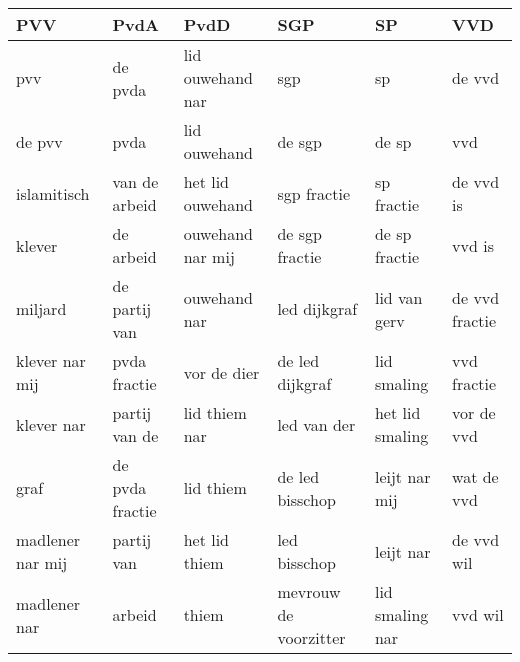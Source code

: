 \begin{tabular}{llllll}
\toprule
              PVV &             PvdA &              PvdD &                    SGP &               SP &             VVD \\
\midrule
              pvv &          de pvda &  lid ouwehand nar &                    sgp &               sp &          de vvd \\
           de pvv &             pvda &      lid ouwehand &                 de sgp &            de sp &             vvd \\
      islamitisch &    van de arbeid &  het lid ouwehand &            sgp fractie &       sp fractie &       de vvd is \\
           klever &        de arbeid &  ouwehand nar mij &         de sgp fractie &    de sp fractie &          vvd is \\
          miljard &    de partij van &      ouwehand nar &           led dijkgraf &     lid van gerv &  de vvd fractie \\
   klever nar mij &     pvda fractie &       vor de dier &        de led dijkgraf &      lid smaling &     vvd fractie \\
       klever nar &    partij van de &     lid thiem nar &            led van der &  het lid smaling &      vor de vvd \\
             graf &  de pvda fractie &         lid thiem &        de led bisschop &    leijt nar mij &      wat de vvd \\
 madlener nar mij &       partij van &     het lid thiem &           led bisschop &        leijt nar &      de vvd wil \\
     madlener nar &           arbeid &             thiem &  mevrouw de voorzitter &  lid smaling nar &         vvd wil \\
\bottomrule
\end{tabular}
